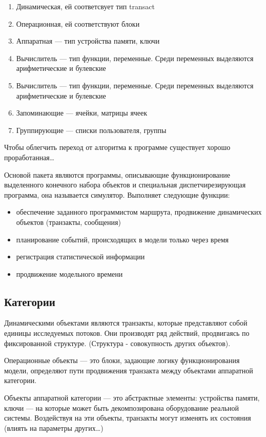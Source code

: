 \documentclass[14pt]{extarticle}
\begin{document}
\begin{enumerate}
	\item Динамическая, ей соответсвует тип transact 
	\item Операционная, ей соответствуют блоки
	\item Аппаратная — тип устройства памяти, ключи
	\item Вычислитель — тип функции, переменные. Среди переменных выделяются арифметические и булевские
	\item Вычислитель — тип функции, переменные. Среди переменных выделяются арифметические и булевские
	\item Запоминающие — ячейки, матрицы ячеек
	\item Группирующие — списки пользователя, группы
\end{enumerate}

Чтобы облегчить переход от алгоритма к программе существует хорошо проработанная…

Основой пакета являются программы, описывающие функционирование выделенного конечного набора объектов и специальная диспетчирезирующая программа, она называется симулятор. Выполняет следующие функции: 

\begin{itemize}
	\item обеспечение заданного программистом маршрута, продвижение динамических объектов (транзакты, сообщения)
	\item планирование событий, происходящих в модели только через время 
	\item регистрация статистической информации 
	\item продвижение модельного времени
\end{itemize}

\subsection*{Категории}

Динамическими объектами являются транзакты, которые представляют собой единицы исследуемых потоков. Они производят ряд действий, продвигаясь по фиксированной структуре. (Структура - совокупность других объектов). 

Операционные объекты — это блоки, задающие логику функционирования модели, определяют пути продвижения транзакта между объектами аппаратной категории.

Объекты аппаратной категории — это абстрактные элементы: устройства памяти, ключи — на которые может быть декомпозирована оборудование реальной системы. Воздействуя на эти объекты, транзакты могут изменять их состояния (влиять на параметры других…)
\end{document}

